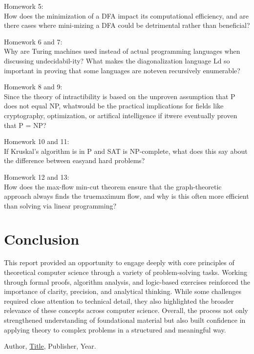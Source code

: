 \documentclass{article}
\theoremstyle{theorem}
\theoremstyle{definition}
\theoremstyle{remark}
\begin{document}
Homework 5: \\
How does the minimization of a DFA impact its computational efficiency, and are there cases where mini-mizing a DFA could be detrimental rather than beneficial?

Homework 6 and 7: \\
Why are Turing machines used instead of actual programming languages when discussing undecidabil-ity?
What makes the diagonalization language Ld so important in proving that some languages are noteven recursively enumerable?

Homework 8 and 9: \\
Since the theory of intractibility is based on the unproven assumption that P does not equal NP, whatwould be the practical implications for fields like cryptography, optimization, or artifical intelligence if itwere eventually proven that P = NP?

Homework 10 and 11: \\
If Kruskal’s algorithm is in P and SAT is NP-complete, what does this say about the difference between easyand hard problems?

Homework 12 and 13:\\
How does the max-flow min-cut theorem ensure that the graph-theoretic approach always finds the truemaximum flow, and why is this often more efficient than solving via linear programming?

\section{Conclusion}\label{conclusion}
This report provided an opportunity to engage deeply with core principles of theoretical computer science through a variety of problem-solving tasks. Working through formal proofs, algorithm analysis, and logic-based exercises reinforced the importance of clarity, precision, and analytical thinking. While some challenges required close attention to technical detail, they also highlighted the broader relevance of these concepts across computer science. Overall, the process not only strengthened understanding of foundational material but also built confidence in applying theory to complex problems in a structured and meaningful way.


\begin{thebibliography}{99}
 Author, \href{https://en.wikipedia.org/wiki/LaTeX}{Title}, Publisher, Year.
\end{thebibliography}
\end{document}
